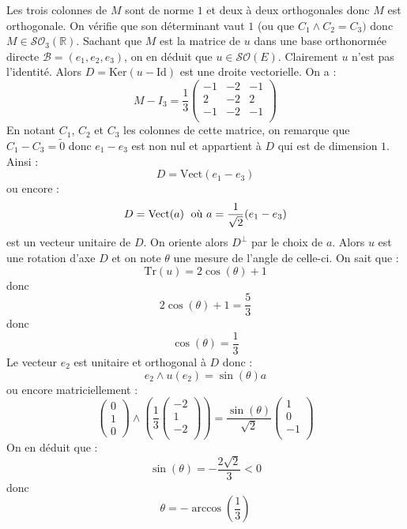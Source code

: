 \documentclass[a4paper,10pt]{report}
\begin{document}
\corr Les trois colonnes de $M$ sont de norme $1$ et deux à deux orthogonales donc $M$ est orthogonale. On vérifie que son déterminant vaut $1$ (ou que $C_1 \wedge C_2 = C_3)$ donc $M \in \mathcal{S}\mathcal{O}_3(\mathbb{R})$. Sachant que $M$ est la matrice de $u$ dans une base orthonormée directe $\mathcal{B}=(e_1,e_2,e_3)$, on en déduit que $u \in   \mathcal{S}\mathcal{O}(E)$. Clairement $u$ n'est pas l'identité. Alors $D=\textrm{Ker}(u - \textrm{Id})$ est une droite vectorielle. On a :
$$ M - I_3 = \dfrac{1}{3} \begin{pmatrix}
-1 & -2 & -1 \\
2 & -2 & 2 \\
-1 & -2 & -1 \\
\end{pmatrix}$$
En notant $C_1$, $C_2$ et $C_3$ les colonnes de cette matrice, on remarque que $C_1-C_3= \tilde{0}$ donc $e_1-e_3$ est non nul et appartient à $D$ qui est de dimension $1$. Ainsi :
$$ D= \textrm{Vect}(e_1-e_3)$$
ou encore :
$$ D = \textrm{Vect}(a) \; \hbox{ où } a = \dfrac{1}{\sqrt{2}} (e_1-e_3)$$
est un vecteur unitaire de $D$. On oriente alors $D^{\perp}$ par le choix de $a$. Alors $u$ est une rotation d'axe $D$ et on note $\theta$ une mesure de l'angle de celle-ci. On sait que :
$$ \textrm{Tr}(u) = 2 \cos(\theta) + 1 $$
donc
$$ 2 \cos(\theta) + 1 = \dfrac{5}{3}$$
donc
$$ \cos(\theta) =  \dfrac{1}{3}$$
Le vecteur $e_2$ est unitaire et orthogonal à $D$ donc :
$$ e_2 \wedge u(e_2) = \sin(\theta) a$$
ou encore matriciellement :
$$ \begin{pmatrix}
0 \\
1 \\
0
\end{pmatrix} \wedge \left( \dfrac{1}{3} \begin{pmatrix}
-2 \\
1 \\
-2 \\
\end{pmatrix}\right) = \frac{\sin(\theta)}{\sqrt{2}} \begin{pmatrix}
1 \\
0 \\
-1 \\
\end{pmatrix}$$
On en déduit que :
$$ \sin(\theta) = -\dfrac{2\sqrt{2}}{3}<0$$
donc
$$ \theta = - \arccos \left( \dfrac{1}{3} \right)$$
\end{document}
